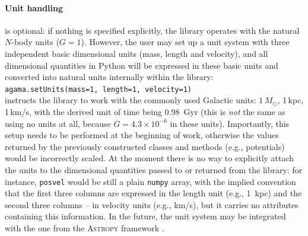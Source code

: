 \documentclass[12pt]{article}
\begin{document}
\paragraph{Unit handling} is optional: if nothing is specified explicitly, the library operates with the natural $N$-body units ($G=1$). However, the user may set up a unit system with three independent basic dimensional units (mass, length and velocity), and all dimensional quantities in Python will be expressed in these basic units and converted into natural units internally within the library:\\[1mm]
\texttt{agama.setUnits(mass=1, length=1, velocity=1)}\\[1mm]
instructs the library to work with the commonly used Galactic units: $1\,M_\odot$, 1\,kpc, 1\,km/s, with the derived unit of time being 0.98~Gyr (this is \textit{not} the same as using no units at all, because $G=4.3\times10^{-6}$ in these units). Importantly, this setup needs to be performed at the beginning of work, otherwise the values returned by the previously constructed classes and methods (e.g., potentials) would be incorrectly scaled.
At the moment there is no way to explicitly attach the units to the dimensional quantities passed to or returned from the library: for instance, \texttt{posvel} would be still a plain \texttt{numpy} array, with the implied convention that the first three columns are expressed in the length unit (e.g., 1~kpc) and the second three columns -- in velocity units (e.g., km/s), but it carries no attributes containing this information. In the future, the unit system may be integrated with the one from the \textsc{Astropy} framework \cite{Astropy}.
\end{document}

